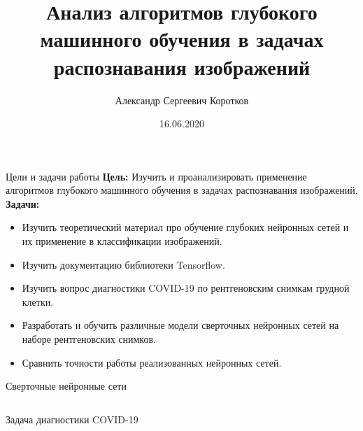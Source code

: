 \documentclass[aspectratio=169]{beamer}
\title{Анализ алгоритмов глубокого машинного обучения  в задачах распознавания изображений}
\author[Коротков А.С.]{Александр Сергеевич Коротков}
\institute[]{Научный руководитель: Д.В. Матвеев}
\date{16.06.2020}
\begin{document}
\maketitle
\begin{frame}{Цели и задачи работы}
    \textbf{Цель:} Изучить и проанализировать применение алгоритмов глубокого машинного обучения в задачах распознавания изображений. \\
    \textbf{Задачи: }
    \begin{itemize}
        \item Изучить теоретический материал про обучение глубоких нейронных сетей и их применение в классификации изображений.
        \item Изучить документацию библиотеки Tensorflow.
        \item Изучить вопрос диагностики COVID-19 по рентгеновским снимкам грудной клетки.
        \item Разработать и обучить различные модели сверточных нейронных сетей на наборе рентгеновских снимков.
        \item Сравнить точности работы реализованных нейронных сетей.
    \end{itemize}
\end{frame}

\begin{frame}{Сверточные нейронные сети}
    \begin{columns}[T]
        \begin{column}{.4\paperwidth}
            \centering
                
        \end{column}
        \begin{column}{.5\paperwidth}
            
        \end{column}
    \end{columns}   
\end{frame}

\begin{frame}{Задача диагностики COVID-19}
\end{frame}
\end{document}
